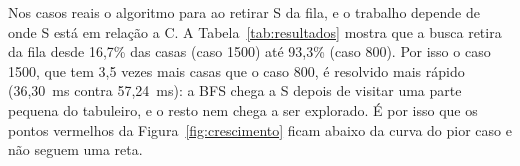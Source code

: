 Nos casos reais o algoritmo para ao retirar S da fila, e o trabalho depende de onde S está em
relação a C. A Tabela~\ref{tab:resultados} mostra que a busca retira da fila desde 16,7\% das
casas (caso 1500) até 93,3\% (caso 800). Por isso o caso 1500, que tem 3,5 vezes mais casas
que o caso 800, é resolvido mais rápido (36,30~ms contra 57,24~ms): a BFS chega a S depois de
visitar uma parte pequena do tabuleiro, e o resto nem chega a ser explorado. É por isso que os
pontos vermelhos da Figura~\ref{fig:crescimento} ficam abaixo da curva do pior caso e não
seguem uma reta.
